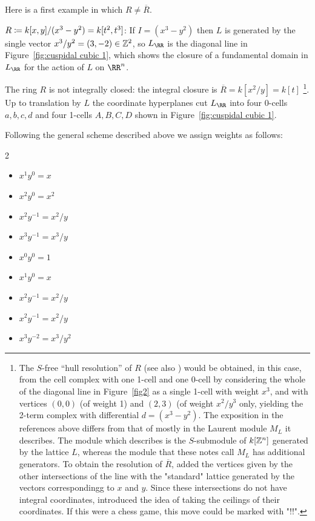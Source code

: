 \documentclass{amsart}
\begin{document}
Here is a first example in which $R \neq \overline R$.

\begin{example} 
  \label{ex:cuspidal-cubic}
  $R\coloneqq k[x,y]/(x^3-y^2) = k[t^{2},t^{3}]$:
If $I = (x^3-y^2)$ then $L$ is generated by the single vector
$x^3/y^2 = (3,-2) \in \mathbb Z^2$, so
$L_\RR$ is the diagonal line in Figure~\ref{fig:cuspidal cubic 1}, which
shows the closure of a fundamental domain in $L_\RR$ for the action of $L$
on $\RR^n$.

The ring $R$ is not integrally closed: the integral closure is $\overline R = k[x^{2}/y] = k[t]$
\footnote{The $S$-free ``hull resolution'' of $R$ \cite[Section 3]{BS98} (see also \cite[Sections 9.2--9.3]{MillerSturmfels2004}) would be obtained, in this case, from the cell complex with one 1-cell and one 0-cell by considering the whole of the diagonal line in Figure~\ref{fig2} as a single 1-cell with weight $x^3$, and with vertices
$(0,0)$ (of weight 1) and $(2,3)$ (of weight $x^2/y^3$ only, yielding the 2-term complex with differential
$d = (x^3-y^2)$.
The exposition in the references above differs from
that of \cite{BCS+25} mostly in the Laurent module $M_L$ it describes. The module which \cite{BS98} describes is the $S$-submodule of $k[\mathbb Z^n]$ generated by the lattice $L$, whereas the module that these notes call $M_L$ has additional generators.
To obtain the resolution of $\overline R$, \cite{BCS+25} added the vertices given by
the other intersections of the line with the "standard" lattice generated
by the vectors correspondingg to $x$ and $y$. Since these intersections do not have integral coordinates, \cite{BCS+25} introduced the idea of taking the ceilings of 
their coordinates. 
If this were a chess game, this move could be marked with "!!".}.
Up to translation by $L$ the coordinate hyperplanes cut $L_\RR$ into four 0-cells $a,b,c,d$ and four 1-cells $A,B,C,D$ shown in Figure~\ref{fig:cuspidal cubic 1}.

\goodbreak


Following the general scheme described above we assign weights as follows:
\begin{multicols}{2}
  \begin{itemize}
  \item[$\Psi(A)$:] $x^1y^0 = x$
  \item[$\Psi(B)$:] $x^2y^0 = x^2$
  \item[$\Psi(C)$:] $x^2y^{-1} = x^2/y$
  \item[$\Psi(D)$:] $x^3y^{-1} = x^3/y$
    \smallskip
  \item[$\Psi(a)$:] $x^0y^0 = 1$
  \item[$\Psi(b)$:] $x^1y^0 = x$
  \item[$\Psi(c)$:] $x^2y^{-1} = x^2/y$
  \item[$\Psi(d)$:] $x^2y^{-1} = x^2/y$
  \item[$\Psi(e)$:] $x^3y^{-2} = x^3/y^{2}$
  \end{itemize}
\end{multicols}


\end{example}
\end{document}
